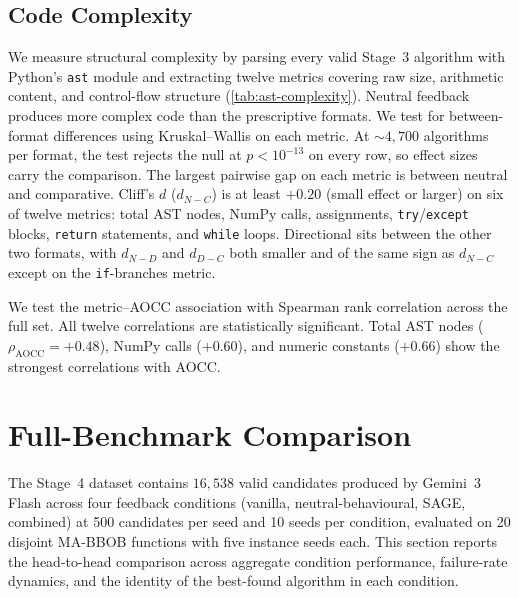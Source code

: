 \subsection{Code Complexity}
\label{sec:results-ast}

We measure structural complexity by parsing every valid Stage~3 algorithm with Python's \texttt{ast} module and extracting twelve metrics covering raw size, arithmetic content, and control-flow structure (\cref{tab:ast-complexity}). Neutral feedback produces more complex code than the prescriptive formats. We test for between-format differences using Kruskal--Wallis on each metric. At $\sim 4{,}700$ algorithms per format, the test rejects the null at $p < 10^{-13}$ on every row, so effect sizes carry the comparison. The largest pairwise gap on each metric is between neutral and comparative. Cliff's $d$ ($d_{N\!-\!C}$) is at least $+0.20$ (small effect or larger) on six of twelve metrics: total AST nodes, NumPy calls, assignments, \texttt{try}/\texttt{except} blocks, \texttt{return} statements, and \texttt{while} loops. Directional sits between the other two formats, with $d_{N\!-\!D}$ and $d_{D\!-\!C}$ both smaller and of the same sign as $d_{N\!-\!C}$ except on the \texttt{if}-branches metric.

We test the metric--AOCC association with Spearman rank correlation across the full set. All twelve correlations are statistically significant. Total AST nodes ($\rho_{\text{AOCC}} = +0.48$), NumPy calls ($+0.60$), and numeric constants ($+0.66$) show the strongest correlations with AOCC.

\section{Full-Benchmark Comparison}
\label{sec:results-stage4}

The Stage~4 dataset contains $16{,}538$ valid candidates produced by Gemini~3 Flash across four feedback conditions (vanilla, neutral-behavioural, SAGE, combined) at 500 candidates per seed and 10 seeds per condition, evaluated on 20 disjoint MA-BBOB functions with five instance seeds each. This section reports the head-to-head comparison across aggregate condition performance, failure-rate dynamics, and the identity of the best-found algorithm in each condition.

